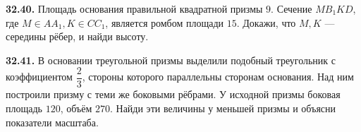 \noindent\begin{minipage}[t]{\linewidth}\textbf{32.40.}\starmark{} Площадь основания правильной квадратной призмы \(9\). Сечение \(MB_1KD\), где \(M\in AA_1,K\in CC_1\), является ромбом площади \(15\). Докажи, что \(M,K\) — середины рёбер, и найди высоту.\par\end{minipage}\par
\noindent\begin{minipage}[t]{\linewidth}\textbf{32.41.} В основании треугольной призмы выделили подобный треугольник с коэффициентом \(\dfrac23\), стороны которого параллельны сторонам основания. Над ним построили призму с теми же боковыми рёбрами. У исходной призмы боковая площадь \(120\), объём \(270\). Найди эти величины у меньшей призмы и объясни показатели масштаба.\par\end{minipage}\par
\endgroup
